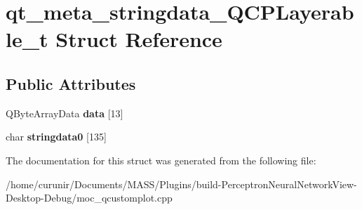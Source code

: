 \hypertarget{structqt__meta__stringdata___q_c_p_layerable__t}{}\section{qt\+\_\+meta\+\_\+stringdata\+\_\+\+Q\+C\+P\+Layerable\+\_\+t Struct Reference}
\label{structqt__meta__stringdata___q_c_p_layerable__t}
\subsection*{Public Attributes}
\begin{DoxyCompactItemize}
\item 
Q\+Byte\+Array\+Data {\bfseries data} \mbox{[}13\mbox{]}\hypertarget{structqt__meta__stringdata___q_c_p_layerable__t_adaa7771b25eb1d5dc6cb97526d7a4995}{}\label{structqt__meta__stringdata___q_c_p_layerable__t_adaa7771b25eb1d5dc6cb97526d7a4995}

\item 
char {\bfseries stringdata0} \mbox{[}135\mbox{]}\hypertarget{structqt__meta__stringdata___q_c_p_layerable__t_a63a3660ec480a3586f023e4d498cee3d}{}\label{structqt__meta__stringdata___q_c_p_layerable__t_a63a3660ec480a3586f023e4d498cee3d}

\end{DoxyCompactItemize}


The documentation for this struct was generated from the following file\+:\begin{DoxyCompactItemize}
\item 
/home/curunir/\+Documents/\+M\+A\+S\+S/\+Plugins/build-\/\+Perceptron\+Neural\+Network\+View-\/\+Desktop-\/\+Debug/moc\+\_\+qcustomplot.\+cpp\end{DoxyCompactItemize}
